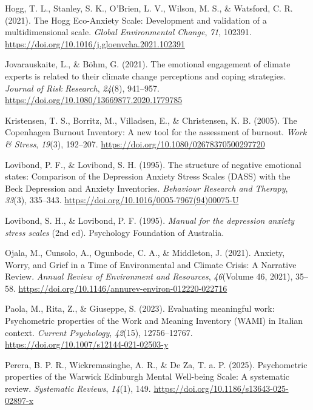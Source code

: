 \documentclass[
  man,
  longtable,
  nolmodern,
  notxfonts,
  notimes,
  colorlinks=true,linkcolor=blue,citecolor=blue,urlcolor=blue]{apa7}
\newlength{\cslhangindent}
\newenvironment{CSLReferences}[2] %
 {\begin{list}{}{%
  \setlength{\itemindent}{0pt}
  \setlength{\leftmargin}{0pt}
  \setlength{\parsep}{0pt}
  \ifodd #1
   \setlength{\leftmargin}{\cslhangindent}
   \setlength{\itemindent}{-1\cslhangindent}
  \fi
  \setlength{\itemsep}{#2\baselineskip}}}
 {\end{list}}
\begin{document}
\begin{CSLReferences}{1}{0}
Hogg, T. L., Stanley, S. K., O'Brien, L. V., Wilson, M. S., \& Watsford,
C. R. (2021). The {Hogg} {Eco}-{Anxiety} {Scale}: {Development} and
validation of a multidimensional scale. \emph{Global Environmental
Change}, \emph{71}, 102391.
\url{https://doi.org/10.1016/j.gloenvcha.2021.102391}

Jovarauskaite, L., \& Böhm, G. (2021). The emotional engagement of
climate experts is related to their climate change perceptions and
coping strategies. \emph{Journal of Risk Research}, \emph{24}(8),
941--957. \url{https://doi.org/10.1080/13669877.2020.1779785}

Kristensen, T. S., Borritz, M., Villadsen, E., \& Christensen, K. B.
(2005). The {Copenhagen} {Burnout} {Inventory}: {A} new tool for the
assessment of burnout. \emph{Work \& Stress}, \emph{19}(3), 192--207.
\url{https://doi.org/10.1080/02678370500297720}

Lovibond, P. F., \& Lovibond, S. H. (1995). The structure of negative
emotional states: {Comparison} of the {Depression} {Anxiety} {Stress}
{Scales} ({DASS}) with the {Beck} {Depression} and {Anxiety}
{Inventories}. \emph{Behaviour Research and Therapy}, \emph{33}(3),
335--343. \url{https://doi.org/10.1016/0005-7967(94)00075-U}

Lovibond, S. H., \& Lovibond, P. F. (1995). \emph{Manual for the
depression anxiety stress scales} (2nd ed). Psychology Foundation of
Australia.

Ojala, M., Cunsolo, A., Ogunbode, C. A., \& Middleton, J. (2021).
Anxiety, {Worry}, and {Grief} in a {Time} of {Environmental} and
{Climate} {Crisis}: {A} {Narrative} {Review}. \emph{Annual Review of
Environment and Resources}, \emph{46}(Volume 46, 2021), 35--58.
\url{https://doi.org/10.1146/annurev-environ-012220-022716}

Paola, M., Rita, Z., \& Giuseppe, S. (2023). Evaluating meaningful work:
{Psychometric} properties of the {Work} and {Meaning} {Inventory}
({WAMI}) in {Italian} context. \emph{Current Psychology}, \emph{42}(15),
12756--12767. \url{https://doi.org/10.1007/s12144-021-02503-y}

Perera, B. P. R., Wickremasinghe, A. R., \& De Za, T. a. P. (2025).
Psychometric properties of the {Warwick} {Edinburgh} {Mental}
{Well}-being {Scale}: A systematic review. \emph{Systematic Reviews},
\emph{14}(1), 149. \url{https://doi.org/10.1186/s13643-025-02897-x}


\end{CSLReferences}
\end{document}
